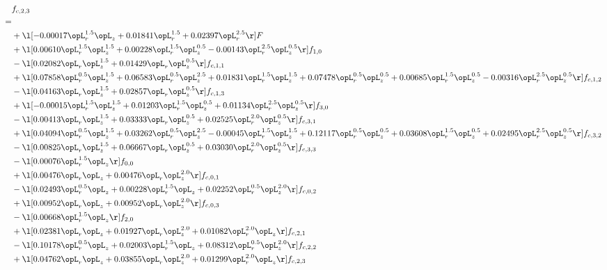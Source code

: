 \begin{alignat}{2} 
\label{eq:f_23_1} 
& f_{c,2,3} \nonumber \\ 
 = \\ 
& + \l[  -0.00017 \opL_r^{1.5} \opL_z +  0.01841 \opL_r^{1.5} +  0.02397 \opL_r^{2.5}  \r] F \nonumber \\ 
& + \l[  0.00610 \opL_r^{1.5} \opL_z^{1.5} +  0.00228 \opL_r^{1.5} \opL_z^{0.5}   -0.00143 \opL_r^{2.5} \opL_z^{0.5}  \r] f_{1,0} \nonumber \\ 
& - \l[  0.02082 \opL_r \opL_z^{1.5} +  0.01429 \opL_r \opL_z^{0.5}  \r] f_{c,1,1} \nonumber \\ 
& + \l[  0.07858 \opL_r^{0.5} \opL_z^{1.5} +  0.06583 \opL_r^{0.5} \opL_z^{2.5} +  0.01831 \opL_r^{1.5} \opL_z^{1.5} +  0.07478 \opL_r^{0.5} \opL_z^{0.5} +  0.00685 \opL_r^{1.5} \opL_z^{0.5}   -0.00316 \opL_r^{2.5} \opL_z^{0.5}  \r] f_{c,1,2} \nonumber \\ 
& - \l[  0.04163 \opL_r \opL_z^{1.5} +  0.02857 \opL_r \opL_z^{0.5}  \r] f_{c,1,3} \nonumber \\ 
& + \l[  -0.00015 \opL_r^{1.5} \opL_z^{1.5} +  0.01203 \opL_r^{1.5} \opL_z^{0.5} +  0.01134 \opL_r^{2.5} \opL_z^{0.5}  \r] f_{3,0} \nonumber \\ 
& - \l[  0.00413 \opL_r \opL_z^{1.5} +  0.03333 \opL_r \opL_z^{0.5} +  0.02525 \opL_r^{2.0} \opL_z^{0.5}  \r] f_{c,3,1} \nonumber \\ 
& + \l[  0.04094 \opL_r^{0.5} \opL_z^{1.5} +  0.03262 \opL_r^{0.5} \opL_z^{2.5}   -0.00045 \opL_r^{1.5} \opL_z^{1.5} +  0.12117 \opL_r^{0.5} \opL_z^{0.5} +  0.03608 \opL_r^{1.5} \opL_z^{0.5} +  0.02495 \opL_r^{2.5} \opL_z^{0.5}  \r] f_{c,3,2} \nonumber \\ 
& - \l[  0.00825 \opL_r \opL_z^{1.5} +  0.06667 \opL_r \opL_z^{0.5} +  0.03030 \opL_r^{2.0} \opL_z^{0.5}  \r] f_{c,3,3} \nonumber \\ 
& - \l[  0.00076 \opL_r^{1.5} \opL_z  \r] f_{0,0} \nonumber \\ 
& + \l[  0.00476 \opL_r \opL_z +  0.00476 \opL_r \opL_z^{2.0}  \r] f_{c,0,1} \nonumber \\ 
& - \l[  0.02493 \opL_r^{0.5} \opL_z +  0.00228 \opL_r^{1.5} \opL_z +  0.02252 \opL_r^{0.5} \opL_z^{2.0}  \r] f_{c,0,2} \nonumber \\ 
& + \l[  0.00952 \opL_r \opL_z +  0.00952 \opL_r \opL_z^{2.0}  \r] f_{c,0,3} \nonumber \\ 
& - \l[  0.00668 \opL_r^{1.5} \opL_z  \r] f_{2,0} \nonumber \\ 
& + \l[  0.02381 \opL_r \opL_z +  0.01927 \opL_r \opL_z^{2.0} +  0.01082 \opL_r^{2.0} \opL_z  \r] f_{c,2,1} \nonumber \\ 
& - \l[  0.10178 \opL_r^{0.5} \opL_z +  0.02003 \opL_r^{1.5} \opL_z +  0.08312 \opL_r^{0.5} \opL_z^{2.0}  \r] f_{c,2,2} \nonumber \\ 
& + \l[  0.04762 \opL_r \opL_z +  0.03855 \opL_r \opL_z^{2.0} +  0.01299 \opL_r^{2.0} \opL_z  \r] f_{c,2,3} \nonumber \\ 
\end{alignat} 


